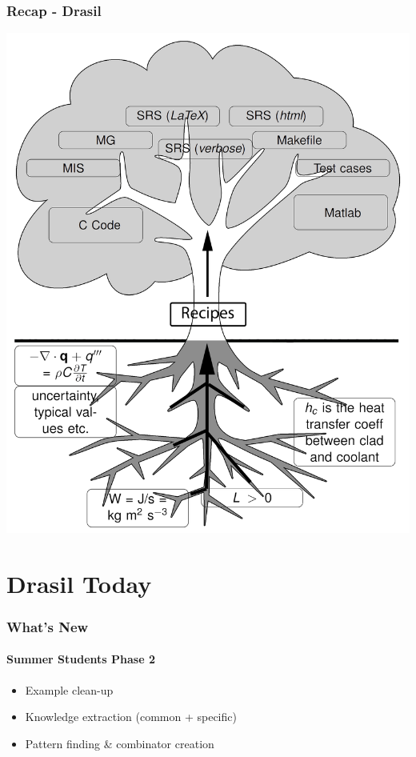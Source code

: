 \documentclass{beamer}
\begin{document}

\begin{frame}

\frametitle{Recap - Drasil}
\begin{center}
	\includegraphics[width=.65\textwidth]{tree.png}
\end{center}

\end{frame}


\section[Drasil]{Drasil Today}


\begin{frame}

\frametitle{What's New}
\framesubtitle{Summer Students Phase 2}

\begin{itemize}
	\item Example clean-up
	\item Knowledge extraction (common + specific)
	\item Pattern finding \& combinator creation
\end{itemize}

\end{frame}

\end{document}
